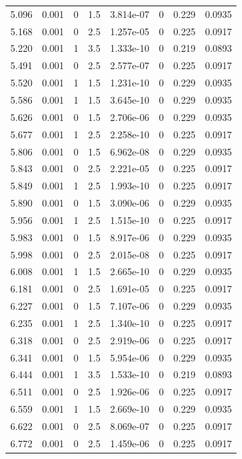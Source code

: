 \documentclass[preview]{standalone}
\begin{document}
{{{\begin{tabular}{L{1.2cm}C{1.2cm} C{0.3cm}C{0.5cm} C{1.4cm}C{1.4cm} C{1.4cm}C{1.4cm}}
  5.096  &  0.001  & 0     & 1.5 &  3.814e-07  & 0  & 0.229 &  0.0935   \\ 
  5.168  &  0.001  & 0     & 2.5 &  1.257e-05  & 0  & 0.225 &  0.0917   \\ 
  5.220  &  0.001  & 1     & 3.5 &  1.333e-10  & 0  & 0.219 &  0.0893   \\ 
  5.491  &  0.001  & 0     & 2.5 &  2.577e-07  & 0  & 0.225 &  0.0917   \\ 
  5.520  &  0.001  & 1     & 1.5 &  1.231e-10  & 0  & 0.229 &  0.0935   \\ 
  5.586  &  0.001  & 1     & 1.5 &  3.645e-10  & 0  & 0.229 &  0.0935   \\ 
  5.626  &  0.001  & 0     & 1.5 &  2.706e-06  & 0  & 0.229 &  0.0935   \\ 
  5.677  &  0.001  & 1     & 2.5 &  2.258e-10  & 0  & 0.225 &  0.0917   \\ 
  5.806  &  0.001  & 0     & 1.5 &  6.962e-08  & 0  & 0.229 &  0.0935   \\ 
  5.843  &  0.001  & 0     & 2.5 &  2.221e-05  & 0  & 0.225 &  0.0917   \\ 
  5.849  &  0.001  & 1     & 2.5 &  1.993e-10  & 0  & 0.225 &  0.0917   \\ 
  5.890  &  0.001  & 0     & 1.5 &  3.090e-06  & 0  & 0.229 &  0.0935   \\ 
  5.956  &  0.001  & 1     & 2.5 &  1.515e-10  & 0  & 0.225 &  0.0917   \\ 
  5.983  &  0.001  & 0     & 1.5 &  8.917e-06  & 0  & 0.229 &  0.0935   \\ 
  5.998  &  0.001  & 0     & 2.5 &  2.015e-08  & 0  & 0.225 &  0.0917   \\ 
  6.008  &  0.001  & 1     & 1.5 &  2.665e-10  & 0  & 0.229 &  0.0935   \\ 
  6.181  &  0.001  & 0     & 2.5 &  1.691e-05  & 0  & 0.225 &  0.0917   \\ 
  6.227  &  0.001  & 0     & 1.5 &  7.107e-06  & 0  & 0.229 &  0.0935   \\ 
  6.235  &  0.001  & 1     & 2.5 &  1.340e-10  & 0  & 0.225 &  0.0917   \\ 
  6.318  &  0.001  & 0     & 2.5 &  2.919e-06  & 0  & 0.225 &  0.0917   \\ 
  6.341  &  0.001  & 0     & 1.5 &  5.954e-06  & 0  & 0.229 &  0.0935   \\ 
  6.444  &  0.001  & 1     & 3.5 &  1.533e-10  & 0  & 0.219 &  0.0893   \\ 
  6.511  &  0.001  & 0     & 2.5 &  1.926e-06  & 0  & 0.225 &  0.0917   \\ 
  6.559  &  0.001  & 1     & 1.5 &  2.669e-10  & 0  & 0.229 &  0.0935   \\ 
  6.622  &  0.001  & 0     & 2.5 &  8.069e-07  & 0  & 0.225 &  0.0917   \\ 
  6.772  &  0.001  & 0     & 2.5 &  1.459e-06  & 0  & 0.225 &  0.0917   \\ 
\hline 
\end{tabular} 

}}}
\end{document}
